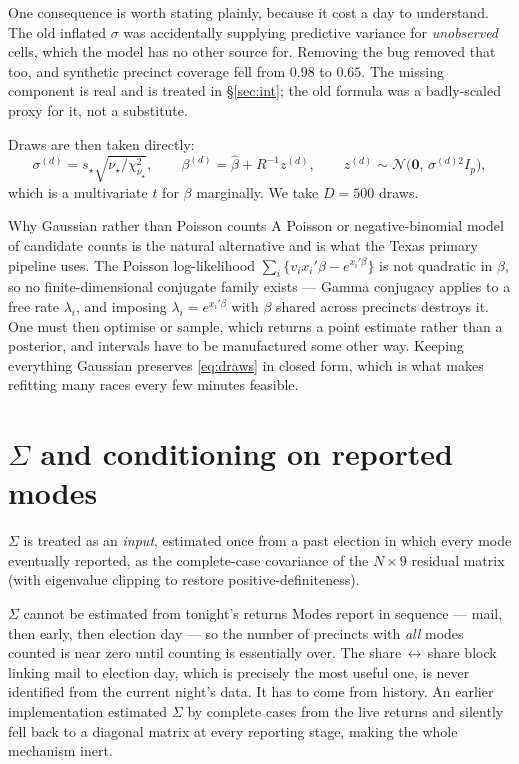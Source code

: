 \documentclass[11pt]{article}
\newcommand{\Norm}{\mathcal{N}}
\begin{document}
One consequence is worth stating plainly, because it cost a day to understand. The old
inflated $\sigma$ was accidentally supplying predictive variance for \emph{unobserved}
cells, which the model has no other source for. Removing the bug removed that too, and
synthetic precinct coverage fell from $0.98$ to $0.65$. The missing component is real and
is treated in \S\ref{sec:int}; the old formula was a badly-scaled proxy for it, not a
substitute.

Draws are then taken directly:
\begin{equation}
  \sigma^{(d)} = s_\star \sqrt{\nu_\star / \chi^2_{\nu_\star}},
  \qquad
  \beta^{(d)} = \hat\beta + R^{-1} z^{(d)},
  \qquad
  z^{(d)} \sim \Norm\big(\mathbf{0},\, \sigma^{(d)2} I_p\big),
  \label{eq:draws}
\end{equation}
which is a multivariate $t$ for $\beta$ marginally. We take $D = 500$ draws.

\begin{memobox}{Why Gaussian rather than Poisson counts}
A Poisson or negative-binomial model of candidate counts is the natural alternative and is
what the Texas primary pipeline uses. The Poisson log-likelihood
$\sum_i \{v_i x_i'\beta - e^{x_i'\beta}\}$ is not quadratic in $\beta$, so no
finite-dimensional conjugate family exists --- Gamma conjugacy applies to a free rate
$\lambda_i$, and imposing $\lambda_i = e^{x_i'\beta}$ with $\beta$ shared across precincts
destroys it. One must then optimise or sample, which returns a point estimate rather than a
posterior, and intervals have to be manufactured some other way. Keeping everything
Gaussian preserves \eqref{eq:draws} in closed form, which is what makes refitting many
races every few minutes feasible.
\end{memobox}

\section{$\Sigma$ and conditioning on reported modes}\label{sec:sigma}

$\Sigma$ is treated as an \emph{input}, estimated once from a past election in which every
mode eventually reported, as the complete-case covariance of the $N \times 9$ residual
matrix (with eigenvalue clipping to restore positive-definiteness).

\begin{memobox}{$\Sigma$ cannot be estimated from tonight's returns}
Modes report in sequence --- mail, then early, then election day --- so the number of
precincts with \emph{all} modes counted is near zero until counting is essentially over.
The share\,$\leftrightarrow$\,share block linking mail to election day, which is precisely
the most useful one, is never identified from the current night's data. It has to come
from history. An earlier implementation estimated $\Sigma$ by complete cases from the live
returns and silently fell back to a diagonal matrix at every reporting stage, making the
whole mechanism inert.
\end{memobox}
\end{document}

